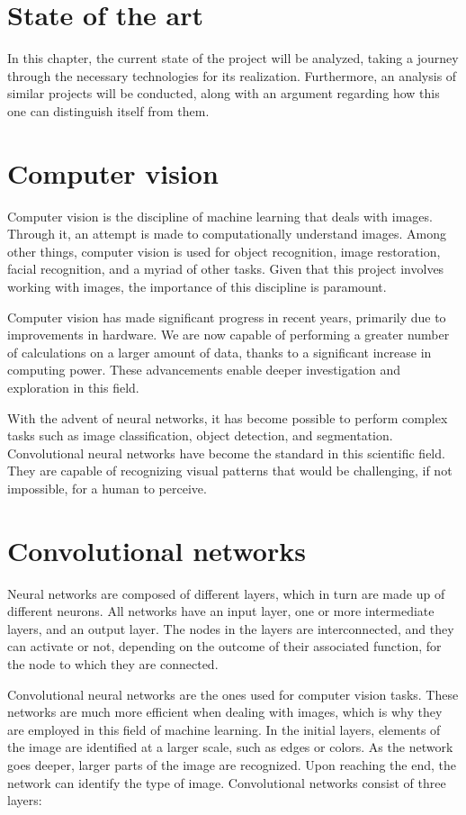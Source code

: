\documentclass[12pt]{report} %
\begin{document}
\section*{State of the art}
In this chapter, the current state of the project will be analyzed, taking a journey through the necessary technologies for its realization. Furthermore, an analysis of similar projects will be conducted, along with an argument regarding how this one can distinguish itself from them.

\section*{Computer vision}

Computer vision is the discipline of machine learning that deals with images. Through it, an attempt is made to computationally understand images. Among other things, computer vision is used for object recognition, image restoration, facial recognition, and a myriad of other tasks. Given that this project involves working with images, the importance of this discipline is paramount.

Computer vision has made significant progress in recent years, primarily due to improvements in hardware. We are now capable of performing a greater number of calculations on a larger amount of data, thanks to a significant increase in computing power. These advancements enable deeper investigation and exploration in this field.

With the advent of neural networks, it has become possible to perform complex tasks such as image classification, object detection, and segmentation. Convolutional neural networks have become the standard in this scientific field. They are capable of recognizing visual patterns that would be challenging, if not impossible, for a human to perceive.
\section*{Convolutional networks}
Neural networks are composed of different layers, which in turn are made up of different neurons. All networks have an input layer, one or more intermediate layers, and an output layer. The nodes in the layers are interconnected, and they can activate or not, depending on the outcome of their associated function, for the node to which they are connected.

Convolutional neural networks are the ones used for computer vision tasks. These networks are much more efficient when dealing with images, which is why they are employed in this field of machine learning. In the initial layers, elements of the image are identified at a larger scale, such as edges or colors. As the network goes deeper, larger parts of the image are recognized. Upon reaching the end, the network can identify the type of image. Convolutional networks consist of three layers:
\end{document}
